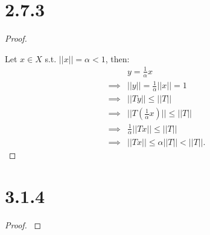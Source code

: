 \documentclass{article}
\begin{document}
\section*{2.7.3}
\begin{proof}
  $ $
  
  Let $x \in X$ s.t. $||x|| = \alpha < 1$, then:
  \begin{align*}
    &y = \frac{1}{\alpha} x \\
    \implies& ||y|| = \frac{1}{\alpha} ||x|| = 1 \\
    \implies& ||Ty|| \leq ||T|| \\
    \implies& ||T (\frac{1}{\alpha} x)|| \leq ||T|| \\
    \implies& \frac{1}{\alpha} ||Tx|| \leq ||T|| \\
    \implies& ||Tx|| \leq \alpha ||T|| < ||T||.
  \end{align*}
  
\end{proof}

\newpage


\section*{3.1.4}
\begin{proof}
  $ $



\end{proof}
\end{document}
